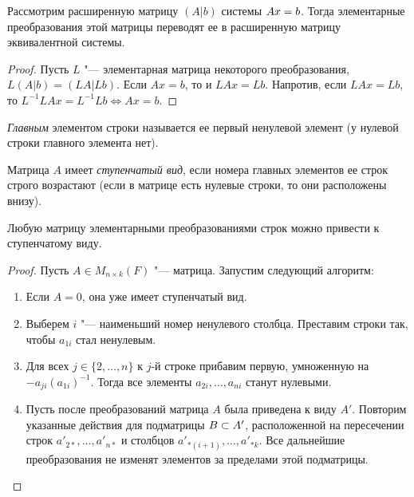 \begin{corollary}
	Рассмотрим расширенную матрицу $(A|b)$ системы $Ax \hm{=} b$. Тогда элементарные преобразования этой матрицы переводят ее в расширенную матрицу эквивалентной системы.
\end{corollary}

\begin{proof}
	Пусть $L$ "--- элементарная матрица некоторого преобразования, $L(A|b) = (LA|Lb)$. Если $Ax = b$, то и $LAx = Lb$. Напротив, если $LAx = Lb$, то $L^{-1}LAx = L^{-1}Lb \Leftrightarrow Ax = b$.
\end{proof}

\begin{definition}
	\textit{Главным} элементом строки называется ее первый ненулевой элемент (у нулевой строки главного элемента нет).
\end{definition}

\begin{definition}
	Матрица $A$ имеет \textit{ступенчатый вид}, если номера главных элементов ее строк строго возрастают (если в матрице есть нулевые строки, то они расположены внизу).
\end{definition}

\begin{theorem}
	Любую матрицу элементарными преобразованиями строк можно привести к ступенчатому виду.
\end{theorem}

\begin{proof}
	Пусть $A \in M_{n \times k}(F)$ "--- матрица. Запустим следующий алгоритм:
	\begin{enumerate}
		\item Если $A = 0$, она уже имеет ступенчатый вид.
		\item Выберем $i$ "--- наименьший номер ненулевого столбца. Преставим строки так, чтобы $a_{1i}$ стал ненулевым.
		\item Для всех $j \in \{2, \dots, n\}$ к $j$-й строке прибавим первую, умноженную на $-a_{ji}(a_{1i})^{-1}$. Тогда все элементы $a_{2i}, \dots, a_{ni}$ станут нулевыми.
		\item Пусть после преобразований матрица $A$ была приведена к виду $A'$. Повторим указанные действия для подматрицы $B \hm{\subset} A'$, расположенной на пересечении строк $a'_{2*}, \dots, a'_{n*}$ и столбцов $a'_{*(i+1)}, \dots, a'_{*k}$. Все дальнейшие преобразования не изменят элементов за пределами этой подматрицы.
	\end{enumerate}
\end{proof}

